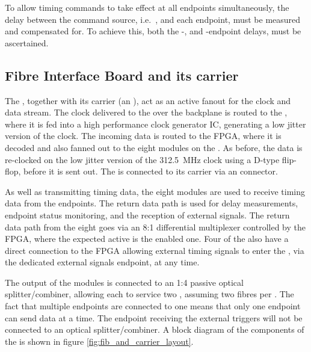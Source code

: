 \documentclass{dune}
\begin{document}
To allow timing commands to take effect at all endpoints simultaneously, the delay between the command source, i.e.\ , and each endpoint, must be measured and compensated for. To achieve this, both the -, and -endpoint delays, must be ascertained.

\subsection{Fibre Interface Board and its carrier}
The , together with its carrier (an ), act as an active fanout for the  clock and data stream. The clock delivered to the  over the  backplane is routed to the , where it is fed into a high performance clock generator IC, generating a low jitter version of the clock. The incoming data is routed to the  FPGA, where it is decoded and also fanned out to the eight  modules on the . As before, the  data is re-clocked on the low jitter version of the \SI{312.5}{\MHz} clock using a D-type flip-flop, before it is sent out. The  is connected to its  carrier via an  connector.

As well as transmitting timing data, the eight  modules are used to receive timing data from the endpoints. The return data path is used for delay measurements, endpoint status monitoring, and the reception of external signals. The return data path from the eight  goes via an 8:1 differential multiplexer controlled by the  FPGA, where the expected active  is the enabled one. Four of the  also have a direct connection to the  FPGA allowing external timing signals to enter the , via the dedicated external signals endpoint, at any time.

The output of the  modules is connected to an 1:4 passive optical splitter/combiner, allowing each  to service two , assuming two fibres per . The fact that multiple endpoints are connected to one  means that only one endpoint can send  data at a time. The endpoint receiving the external triggers will not be connected to an optical splitter/combiner. A block diagram of the components of the  is shown in figure \ref{fig:fib_and_carrier_layout}.
\end{document}
